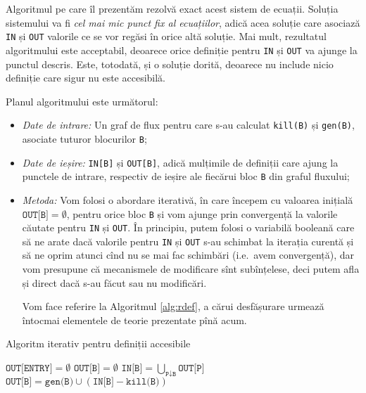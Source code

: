 Algoritmul pe care îl prezentăm rezolvă exact acest sistem de ecuații.
Soluția sistemului va fi \emph{cel mai mic punct fix al ecuațiilor}, adică
acea soluție care asociază \texttt{IN} și \texttt{OUT} valorile ce se vor
regăsi în orice altă soluție. Mai mult, rezultatul algoritmului
este acceptabil, deoarece orice definiție pentru \texttt{IN} și \texttt{OUT}
va ajunge la punctul descris. Este, totodată, și o soluție dorită,
deoarece nu include nicio definiție care sigur nu este accesibilă.

Planul algoritmului este următorul:
\begin{itemize}
\item \emph{Date de intrare:} Un graf de flux pentru care s-au calculat
  \texttt{kill(B)} și \texttt{gen(B)}, asociate tuturor blocurilor \texttt{B};
\item \emph{Date de ieșire:} \texttt{IN[B]} și \texttt{OUT[B]}, adică
  mulțimile de definiții care ajung la punctele de intrare, respectiv de ieșire
  ale fiecărui bloc \texttt{B} din graful fluxului;
\item \emph{Metoda:} Vom folosi o abordare iterativă, în care începem
  cu valoarea inițială $ \texttt{OUT[B]} = \emptyset $, pentru orice bloc \texttt{B}
  și vom ajunge prin convergență la valorile căutate pentru \texttt{IN} și \texttt{OUT}.
  În principiu, putem folosi o variabilă booleană care să ne arate dacă valorile
  pentru \texttt{IN} și \texttt{OUT} s-au schimbat la iterația curentă și să ne
  oprim atunci cînd nu se mai fac schimbări (i.e.\ avem convergență), dar vom
  presupune că mecanismele de modificare sînt subînțelese, deci putem afla
  și direct dacă s-au făcut sau nu modificări.

  Vom face referire la Algoritmul \ref{alg:rdef}, a cărui desfășurare urmează
  întocmai elementele de teorie prezentate pînă acum.
\end{itemize}

\begin{algorithm}
  \caption{Algoritm iterativ pentru definiții accesibile}
  \begin{algorithmic}[1]
    \State $ \texttt{OUT[ENTRY]} = \emptyset $
    \State $ \texttt{OUT[B]} = \emptyset $
    \EndFor
    \State $ \texttt{IN[B]} = \bigcup_{\texttt{P} \downarrow \texttt{B}} \texttt{OUT[P]} $
    \State $ \texttt{OUT[B]} = \texttt{gen(B)} \cup (\texttt{IN[B]} - \texttt{kill(B)}) $
    \EndFor
    \EndWhile
    \EndProcedure
  \end{algorithmic}
  \label{alg:rdef}
\end{algorithm}


